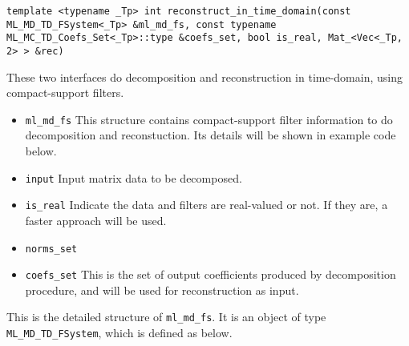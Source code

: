 \documentclass[a4paper,5pt]{article}
\begin{document}
\noindent
\lstinline{template <typename _Tp> int reconstruct_in_time_domain(const ML_MD_TD_FSystem<_Tp> &ml_md_fs, const typename ML_MC_TD_Coefs_Set<_Tp>::type &coefs_set, bool is_real, Mat_<Vec<_Tp, 2> > &rec) }

These two interfaces do decomposition and reconstruction in time-domain, using compact-support filters.

\begin{itemize}
\item \lstinline{ml_md_fs} This structure contains compact-support filter information to do decomposition and reconstuction. Its details will be shown in example code below.
\item \lstinline{input} Input matrix data to be decomposed.
\item \lstinline{is_real} Indicate the data and filters are real-valued or not. If they are, a faster approach will be used.
\item \lstinline{norms_set}
\item \lstinline{coefs_set} This is the set of output coefficients produced by decomposition procedure, and will be used for reconstruction as input.
\end{itemize} 

This is the detailed structure of \lstinline{ml_md_fs}. It is an object of type \lstinline{ML_MD_TD_FSystem}, which is defined as below.
\end{document}
